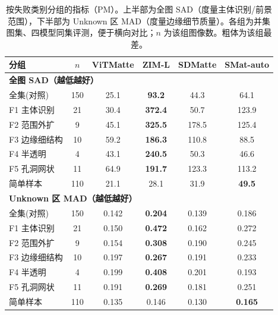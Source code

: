\begin{table}[ht]
	\centering
	\caption{按失败类别分组的指标（PM）。上半部为全图 SAD（度量主体识别/前景范围），下半部为 Unknown 区 MAD（度量边缘细节质量）。各组为并集图集、四模型同集评测，便于横向对比；$n$ 为该组图像数。粗体为该组最差。}
	\label{tab:failgroup}
	\small
	\begin{tabular}{lccccc}
		\toprule
		分组 & $n$ & ViTMatte & ZIM-L & SDMatte & SMat-auto \\
		\midrule
		\multicolumn{6}{l}{\textbf{全图 SAD（越低越好）}} \\
		全集(对照) & 150 & 25.1 & \textbf{93.2} & 44.3 & 64.1 \\
		F1 主体识别 & 21 & 30.4 & \textbf{372.4} & 50.7 & 123.9 \\
		F2 范围外扩 & 9 & 45.1 & \textbf{325.5} & 178.5 & 125.4 \\
		F3 边缘细结构 & 10 & 59.2 & \textbf{186.3} & 110.8 & 88.5 \\
		F4 半透明 & 4 & 43.1 & \textbf{240.5} & 50.3 & 46.6 \\
		F5 孔洞网状 & 11 & 64.9 & \textbf{191.7} & 123.3 & 113.2 \\
		简单样本 & 110 & 21.1 & 28.1 & 31.9 & \textbf{49.5} \\
		\midrule
		\multicolumn{6}{l}{\textbf{Unknown 区 MAD（越低越好）}} \\
		全集(对照) & 150 & 0.142 & \textbf{0.204} & 0.139 & 0.186 \\
		F1 主体识别 & 21 & 0.150 & \textbf{0.472} & 0.162 & 0.272 \\
		F2 范围外扩 & 9 & 0.154 & \textbf{0.308} & 0.190 & 0.245 \\
		F3 边缘细结构 & 10 & 0.197 & \textbf{0.267} & 0.191 & 0.233 \\
		F4 半透明 & 4 & 0.199 & \textbf{0.408} & 0.201 & 0.193 \\
		F5 孔洞网状 & 11 & 0.191 & \textbf{0.269} & 0.181 & 0.251 \\
		简单样本 & 110 & 0.135 & 0.146 & 0.130 & \textbf{0.165} \\
		\bottomrule
	\end{tabular}
\end{table}
